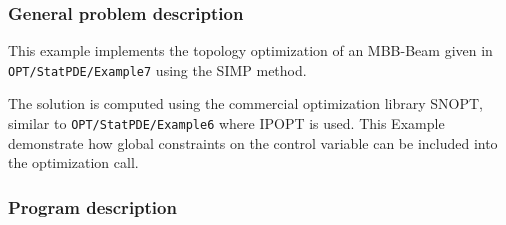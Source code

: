 \subsubsection{General problem description}
This example implements the topology optimization of an MBB-Beam given in \\
{\tt OPT/StatPDE/Example7} using the SIMP method.

The solution is computed using the commercial optimization library SNOPT, similar 
to {\tt OPT/StatPDE/Example6} where IPOPT is used. 
This Example demonstrate how global constraints on
the control variable can be included into the optimization call.

\subsubsection{Program description}
